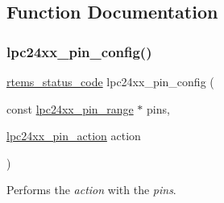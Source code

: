 \subsection{Function Documentation}
\mbox{\label{group__lpc24xx__io_gaaa704e4a54e338c74eebce54e23547cd}} 
\subsubsection{\texorpdfstring{lpc24xx\_pin\_config()}{lpc24xx\_pin\_config()}}
{\footnotesize\ttfamily \mbox{\hyperlink{group__ClassicStatus_ga545d41846817eaba6143d52ee4d9e9fe}{rtems\+\_\+status\+\_\+code}} lpc24xx\+\_\+pin\+\_\+config (\begin{DoxyParamCaption}\item[{const \mbox{\hyperlink{unionlpc24xx__pin__range}{lpc24xx\+\_\+pin\+\_\+range}} $\ast$}]{pins,  }\item[{\mbox{\hyperlink{group__lpc24xx__io_ga5fb61bf67da6335979ce02d1d7f3630e}{lpc24xx\+\_\+pin\+\_\+action}}}]{action }\end{DoxyParamCaption})}



Performs the {\itshape action} with the {\itshape pins}. 


